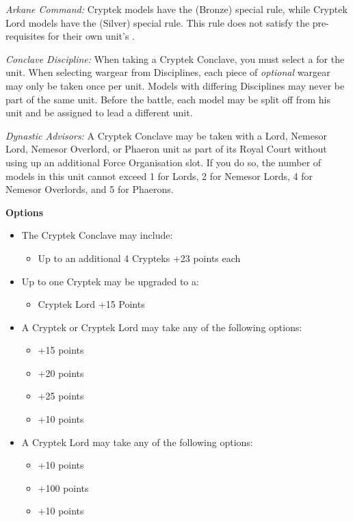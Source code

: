 \begin{minipage}[t]{0.72\textwidth}
	\textit{Arkane Command:} Cryptek models have the  (Bronze) special rule, while Cryptek Lord models have the  (Silver) special rule. This rule does not satisfy the pre-requisites for their own unit's .
	
	\textit{Conclave Discipline:} When taking a Cryptek Conclave, you must select a  for the unit. When selecting wargear from Disciplines, each piece of \textit{optional} wargear may only be taken once per unit. Models with differing Disciplines may never be part of the same unit. Before the battle, each model may be split off from his unit and be assigned to lead a different unit.
	
	\textit{Dynastic Advisors:} A Cryptek Conclave may be taken with a Lord, Nemesor Lord, Nemesor Overlord, or Phaeron unit as part of its Royal Court without using up an additional Force Organisation slot. If you do so, the number of models in this unit cannot exceed 1 for Lords, 2 for Nemesor Lords, 4 for Nemesor Overlords, and 5 for Phaerons.
	
	\vspace*{2em}
	\textbf{Options}
	\begin{itemize}
		\item The Cryptek Conclave may include:
		\begin{itemize}
			\item Up to an additional 4 Crypteks \dotfill +23 points each
		\end{itemize}
		\item Up to one Cryptek may be upgraded to a:
		\begin{itemize}
			\item Cryptek Lord \dotfill +15 Points
		\end{itemize}
		\item A Cryptek or Cryptek Lord may take any of the following options:
		\begin{itemize}
			\item {} \dotfill +15 points
			\item {} \dotfill +20 points
			\item {} \dotfill +25 points
			\item {} \dotfill +10 points
		\end{itemize}
		\item A Cryptek Lord may take any of the following options:
		\begin{itemize}
			\item {} \dotfill +10 points
			\item {} \dotfill +100 points
			\item {} \dotfill +10 points
		\end{itemize}
	\end{itemize}


\end{minipage}
